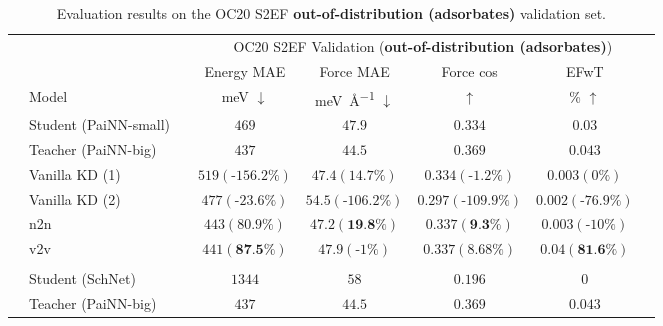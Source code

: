 \documentclass{article}
\begin{document}
\begin{table}[H]
\centering
\caption{Evaluation results on the OC20 S2EF \textbf{out-of-distribution (adsorbates)} validation set.}
\begin{tabular}{llcccccc}
\multicolumn{1}{c}{\multirow{3}{*}{}} & & & \multicolumn{5}{c}{OC20 S2EF Validation (\textbf{out-of-distribution (adsorbates)})} 
\\\cmidrule(r){4-7}
\multicolumn{1}{c}{}   &   &                   &      Energy MAE  &    Force MAE  & Force cos & EFwT \\
&   \multicolumn{1}{l}{Model}     &        &      \si{\milli\electronvolt} $\downarrow$   &    \si{\milli\electronvolt\per\angstrom} $\downarrow$     & $\uparrow$  & \% $\uparrow$ \\\cmidrule(r){1-7}
\parbox[t]{2mm}{} & Student (PaiNN-small)               &   &              $469$      &     $47.9$     &  $0.334$ &  $0.03$  \\
& Teacher (PaiNN-big)                  &   &              $437$        &   $44.5$     &   $0.369$      &   $0.043$    \\
& Vanilla KD (1)         &   &            $519 (\text{-}156.2\%)$          &          $47.4 (14.7\%)$     &     $0.334 (\text{-}1.2\%)$        &  $0.003 (0\%)$   \\
& Vanilla KD (2)         &   &                $477 (\text{-}23.6\%)$      &          $54.5 (\text{-}106.2\%)$     &     $0.297 (\text{-}109.9\%)$        &   $0.002 (\text{-}76.9\%)$ \\
& n2n              &   &             $443 (80.9\%)$         &          $47.2 (\textbf{19.8\%})$     &     $0.337 (\textbf{9.3\%})$        & $0.003 (\text{-}10\%)$    \\
& v2v                &   &          $441 (\textbf{87.5}\%)$            &          $47.9 (\text{-}1\%)$     &     $0.337 (8.68\%)$        & $0.04 (\textbf{81.6\%})$    \\
 \\
\parbox[t]{2mm}{} & Student (SchNet)                  &   &              $1344$     &   $58$    &  $0.196$  &  $0$   \\
& Teacher (PaiNN-big)                  &   &              $437$        &   $44.5$     &   $0.369$      &   $0.043$    \\

\end{tabular}
\end{table}
\end{document}

